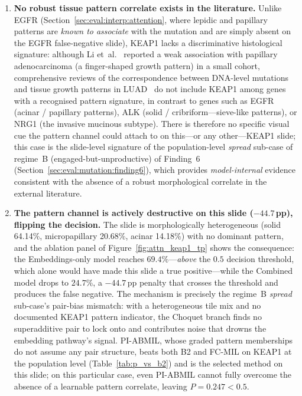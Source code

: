 \begin{enumerate}
    \item \textbf{No robust tissue pattern correlate exists in
    the literature.}
    Unlike EGFR (Section~\ref{sec:eval:interp:attention}, where
    lepidic and papillary patterns are \emph{known to associate}
    with the mutation and are simply absent on the
    EGFR false-negative slide), KEAP1 lacks a discriminative
    histological signature: although Li
    et~al.~\cite{li2011keap1papillary} reported a weak
    association with papillary adenocarcinoma (a finger-shaped
    growth pattern) in a small cohort, comprehensive reviews of
    the correspondence between DNA-level mutations and tissue
    growth patterns in LUAD~\cite{hung2020molecular} do not
    include KEAP1 among genes with a recognised pattern
    signature, in contrast to genes such as EGFR (acinar /
    papillary patterns), ALK (solid / cribriform---sieve-like
    patterns), or NRG1 (the invasive mucinous subtype).
    There is therefore no specific visual cue the pattern channel
    could attach to on this---or any other---KEAP1 slide; this
    case is the slide-level signature of the population-level
    \emph{spread} sub-case of regime~B
    (engaged-but-unproductive) of Finding~6
    (Section~\ref{sec:eval:mutation:finding6}), which provides
    \emph{model-internal} evidence consistent with the absence of
    a robust morphological correlate in the external literature.

    \item \textbf{The pattern channel is actively destructive on
    this slide ($-44.7$\,pp), flipping the decision.}
    The slide is morphologically heterogeneous (solid 64.14\%,
    micropapillary 20.68\%, acinar 14.18\%) with no dominant
    pattern, and the ablation panel of
    Figure~\ref{fig:attn_keap1_tp} shows the consequence: the
    Embeddings-only model reaches $69.4\%$---\emph{above} the
    $0.5$ decision threshold, which alone would have made this
    slide a true positive---while the Combined model drops to
    $24.7\%$, a $-44.7$\,pp penalty that crosses the threshold
    and produces the false negative.
    The mechanism is precisely the regime~B \emph{spread}
    sub-case's pair-bias mismatch: with a heterogeneous tile mix
    and no documented KEAP1 pattern indicator, the Choquet
    branch finds no superadditive pair to lock onto and
    contributes noise that drowns the embedding pathway's signal.
    PI-ABMIL, whose graded pattern memberships do not assume any
    pair structure, beats both B2 and FC-MIL on KEAP1 at the
    population level (Table~\ref{tab:p_vs_b2}) and is the
    selected method on this slide; on this particular case, even
    PI-ABMIL cannot fully overcome the absence of a learnable
    pattern correlate, leaving $P = 0.247 < 0.5$.


\end{enumerate}
